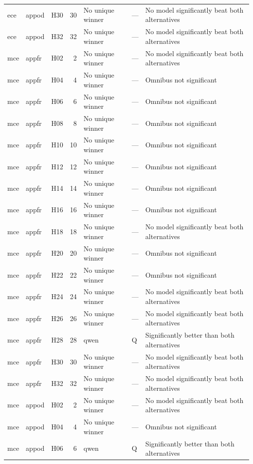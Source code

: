 \begin{longtable}{lllrlll}
ece & appod & H30 & 30 & No unique winner & — & No model significantly beat both alternatives \\
ece & appod & H32 & 32 & No unique winner & — & No model significantly beat both alternatives \\
mce & appfr & H02 & 2 & No unique winner & — & No model significantly beat both alternatives \\
mce & appfr & H04 & 4 & No unique winner & — & Omnibus not significant \\
mce & appfr & H06 & 6 & No unique winner & — & Omnibus not significant \\
mce & appfr & H08 & 8 & No unique winner & — & Omnibus not significant \\
mce & appfr & H10 & 10 & No unique winner & — & Omnibus not significant \\
mce & appfr & H12 & 12 & No unique winner & — & Omnibus not significant \\
mce & appfr & H14 & 14 & No unique winner & — & Omnibus not significant \\
mce & appfr & H16 & 16 & No unique winner & — & Omnibus not significant \\
mce & appfr & H18 & 18 & No unique winner & — & No model significantly beat both alternatives \\
mce & appfr & H20 & 20 & No unique winner & — & Omnibus not significant \\
mce & appfr & H22 & 22 & No unique winner & — & Omnibus not significant \\
mce & appfr & H24 & 24 & No unique winner & — & No model significantly beat both alternatives \\
mce & appfr & H26 & 26 & No unique winner & — & No model significantly beat both alternatives \\
mce & appfr & H28 & 28 & qwen & Q & Significantly better than both alternatives \\
mce & appfr & H30 & 30 & No unique winner & — & No model significantly beat both alternatives \\
mce & appfr & H32 & 32 & No unique winner & — & No model significantly beat both alternatives \\
mce & appod & H02 & 2 & No unique winner & — & No model significantly beat both alternatives \\
mce & appod & H04 & 4 & No unique winner & — & Omnibus not significant \\
mce & appod & H06 & 6 & qwen & Q & Significantly better than both alternatives \\

\end{longtable}
